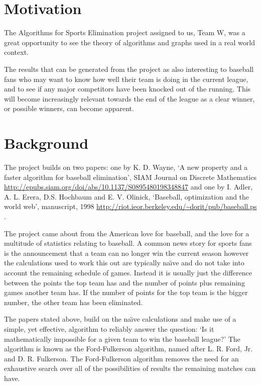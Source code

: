 \section{Motivation}

The Algorithms for Sports Elimination project assigned to us, Team W, was a
great opportunity to see the theory of algorithms and graphs used in a real
world context.

The results that can be generated from the project as also interesting to
baseball fans who may want to know how well their team is doing in the current
league, and to see if any major competitors have been knocked out of the
running. This will become increasingly relevant towards the end of the league
as a clear winner, or possible winners, can become apparent.

\section{Background}

The project builds on two papers: one by K. D. Wayne, `A new property and a
faster algorithm for baseball elimination', SIAM Journal on Discrete
Mathematics \url{http://epubs.siam.org/doi/abs/10.1137/S0895480198348847}
\cite{Wayne} and one by I. Adler, A. L. Erera, D.S. Hochbaum and E. V. Olinick,
`Baseball, optimization and the world web', manuscript, 1998
\url{http://riot.ieor.berkeley.edu/~dorit/pub/baseball.ps} \cite{Adler}.

The project came about from the American love for baseball, and the love for
a multitude of statistics relating to baseball. A common news story for sports
fans is the announcement that a team can no longer win the current season
however the calculations used to work this out are typically na\"{\i}ve and
do not take into account the remaining schedule of games. Instead it is
usually just the difference between the points the top team has and the number
of points plus remaining games another team has. If the number of points
for the top team is the bigger number, the other team has been eliminated.

The papers stated above, build on the na\"{\i}ve calculations and make use of a
simple, yet effective, algorithm to reliably answer the question:
`Is it mathematically impossible for a given team to win the baseball league?'
The algorithm is known as the Ford-Fulkerson algorithm, named after L. R. Ford,
Jr. and D. R. Fulkerson. The Ford-Fulkerson algorithm removes the need for an
exhaustive search over all of the possibilities of results the remaining
matches can have.

